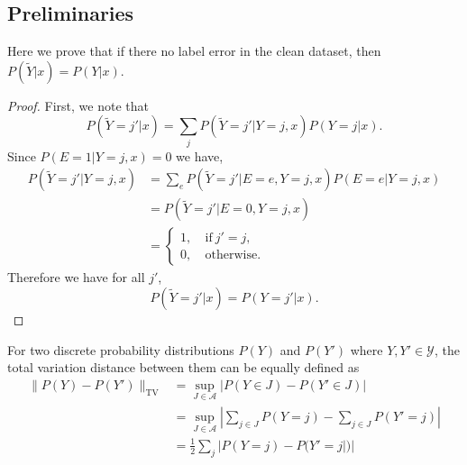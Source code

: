 \subsection{Preliminaries}
Here we prove that if there no label error in the clean dataset, then $P(\tilde{Y}|x) = P(Y|x)$.

\begin{proof}
First, we note that 
$$
    P(\tilde{Y}=j'|x) = \sum_j P(\tilde{Y}=j'| Y=j, x) P(Y=j|x).
$$
Since $P(E=1| Y=j, x) = 0$ we have,
$$
    \begin{aligned}
    P(\tilde{Y}=j'| Y=j, x)
    & = \sum_e P(\tilde{Y}=j'| E=e, Y=j, x) P(E=e| Y=j, x)  \\
    & = P (\tilde{Y}=j'| E=0, Y=j, x) \\
    & = 
    \begin{cases}
    1, & ~\text{if}~j'=j,\\
    0, & ~\text{otherwise}.
    \end{cases}
    \end{aligned}
$$
Therefore we have for all $j'$,
$$
    P(\tilde{Y}=j'|x) = P(Y=j'|x). 
$$
\end{proof}



    For two discrete probability distributions $P(Y)$ and $P(Y')$ where $Y, Y'\in\mathcal{Y}$, the total variation distance between them can be equally defined as
    $$
     \begin{aligned}
       \|P(Y) - P(Y')\|_{\text{TV}} 
       & = \sup_{J\in \mathcal{A}} \left| P(Y\in J) - P(Y'\in J)\right| \\
       & = \sup_{J\in \mathcal{A}} \left| \sum_{j\in J} P(Y=j) - \sum_{j\in J}P(Y'=j)\right| \\
      & = \frac{1}{2}\sum_j |P(Y=j) - P(Y'=j|)| \\
     \end{aligned}
    $$
     